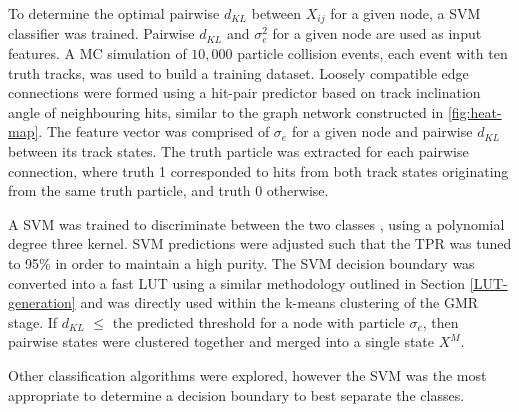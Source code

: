 To determine the optimal pairwise $d_{KL}$ between $X_{ij}$ for a given node, a SVM classifier was trained. Pairwise $d_{KL}$ and $\sigma_{e}^{2}$ for a given node are used as input features. A MC simulation of $10,000$ particle collision events, each event with ten truth tracks, was used to build a training dataset. Loosely compatible edge connections were formed using a hit-pair predictor based on track inclination angle of neighbouring hits, similar to the graph network constructed in \ref{fig:heat-map}. The feature vector was comprised of $\sigma_{e}$ for a given node and pairwise $d_{KL}$ between its track states. The truth particle was extracted for each pairwise connection, where truth 1 corresponded to hits from both track states originating from the same truth particle, and truth 0 otherwise. 


A SVM was trained to discriminate between the two classes \cite{scikit-learn}, using a polynomial degree three kernel. SVM predictions were adjusted such that the TPR was tuned to 95\% in order to maintain a high purity. The SVM decision boundary was converted into a fast LUT using a similar methodology outlined in Section \ref{LUT-generation} and was directly used within the k-means clustering of the GMR stage. If $d_{KL}$ $\leq$ the predicted threshold for a node with particle $\sigma_e$, then pairwise states were clustered together and merged into a single state $X^M$.


Other classification algorithms were explored, however the SVM was the most appropriate to determine a decision boundary to best separate the classes.






